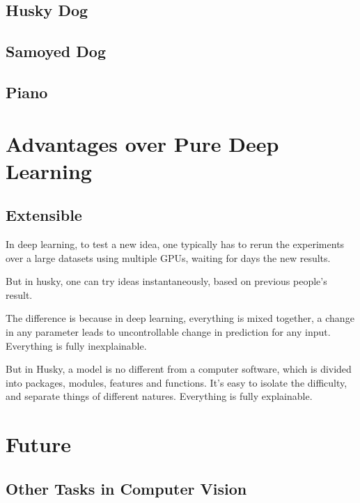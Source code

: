 \documentclass[11pt]{article} 	%
\theoremstyle{definition}
\begin{document}
\subsection{Husky Dog}

\subsection{Samoyed Dog}

\subsection{Piano}

\section{Advantages over Pure Deep Learning}

\subsection{Extensible}

In deep learning, to test a new idea, one typically has to rerun the experiments over a large datasets using multiple GPUs, waiting for days the new results.

But in husky, one can try ideas instantaneously, based on previous people's result.

The difference is because in deep learning, everything is mixed together, a change in any parameter leads to uncontrollable change in prediction for any input. Everything is fully inexplainable.

But in Husky, a model is no different from a computer software, which is divided into packages, modules, features and functions. It's easy to isolate the difficulty, and separate things of different natures. Everything is fully explainable.

\subsection{}


\section{Future}

\subsection{Other Tasks in Computer Vision}
\end{document}

